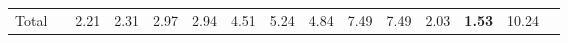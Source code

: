 \begin{tabular}{ll|rrrrrrrrr|rrrr}
  \hline
  Total  & &



  


  
  2.21 & 2.31 & 2.97 & 2.94 & 4.51 & 5.24 & 4.84 & 7.49 & 7.49 & 2.03 & \textbf{1.53} & 10.24 \\


\end{tabular}
